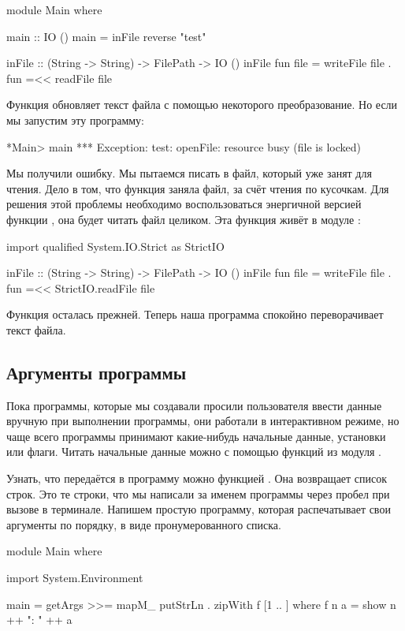 \begin{code}
module Main where

main :: IO ()
main = inFile reverse "test"

inFile :: (String -> String) -> FilePath -> IO ()
inFile fun file = writeFile file . fun =<< readFile file
\end{code}

Функция  обновляет текст файла с помощью некоторого
преобразование. Но если мы запустим эту программу:


\begin{code}
*Main> main
*** Exception: test: openFile: resource busy (file is locked)
\end{code}

Мы получили ошибку. Мы пытаемся писать в файл, который уже занят для
чтения. Дело в том, что функция  заняла файл, за счёт
чтения по кусочкам. Для решения этой проблемы необходимо воспользоваться
энергичной версией функции , она будет читать файл целиком.
Эта функция живёт в модуле :


\begin{code}
import qualified System.IO.Strict as StrictIO

inFile :: (String -> String) -> FilePath -> IO ()
inFile fun file = writeFile file . fun =<< StrictIO.readFile file
\end{code}

Функция  осталась прежней. Теперь наша программа спокойно
переворачивает текст файла.

\subsection{Аргументы программы}

Пока программы, которые мы создавали просили пользователя ввести данные
вручную при выполнении программы, они работали в интерактивном режиме,
но чаще всего программы принимают какие-нибудь начальные данные,
установки или флаги. Читать начальные данные можно с помощью функций из
модуля .

Узнать, что передаётся в программу можно функцией
. Она возвращает список строк. Это те строки,
что мы написали за именем программы через пробел при вызове в терминале.
Напишем простую программу, которая распечатывает свои аргументы по
порядку, в виде пронумерованного списка.


\begin{code}
module Main where

import System.Environment

main = getArgs >>= mapM_ putStrLn . zipWith f [1 .. ]
    where f n a = show n ++ ": " ++ a
\end{code}


